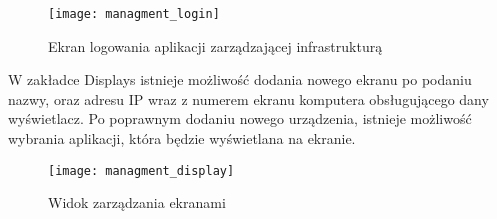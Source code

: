 \begin{figure}
\begin{center}
    \texttt{[image: managment\_login]}
\end{center}
\caption{Ekran logowania aplikacji zarządzającej infrastrukturą}
\label{fig:managment_login}
\end{figure}

W zakładce Displays istnieje możliwość dodania nowego ekranu po podaniu nazwy, oraz adresu IP wraz z numerem ekranu komputera obsługującego dany wyświetlacz. Po poprawnym dodaniu nowego urządzenia, istnieje możliwość wybrania aplikacji, która będzie wyświetlana na ekranie.

\begin{figure}
\begin{center}
	\texttt{[image: managment\_display]}
\end{center}
\caption{Widok zarządzania ekranami}
\label{fig:managment_display}
\end{figure}




